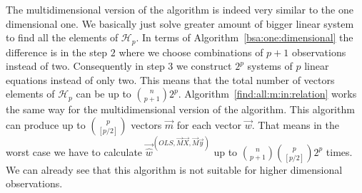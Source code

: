 



The multidimensional version of the algorithm is indeed very similar to the one dimensional one. We basically just solve greater amount of bigger linear system to find all the elements of $\mathcal{H}_p$. In terms of Algorithm~\ref{bsa:one:dimensional} the difference is in the step $2$ where we choose combinations of $p+1$ observations instead of two. Consequently in step $3$ we construct $2^p$ systems of $p$ linear equations instead of only two. This means that the total number of vectors elements of $\mathcal{H}_p$ can be up to $\binom{n}{p+1} 2^p$. Algorithm~\ref{find:all:m:in:relation} works the same way for the multidimensional version of the algorithm. This algorithm can produce up to $\binom{p}{[p/2]}$ vectors $\vec{m}$ for each vector $\vec{w}$. That means in the worst case we have to calculate 
$\vec{\hat{w}}^{(OLS,\vec{M}\vec{X}, \vec{M}\vec{y})}$ up to $\binom{n}{p+1} \binom{p}{[p/2]} 2^p$ times. We can already see that this algorithm is not suitable for higher dimensional observations.


